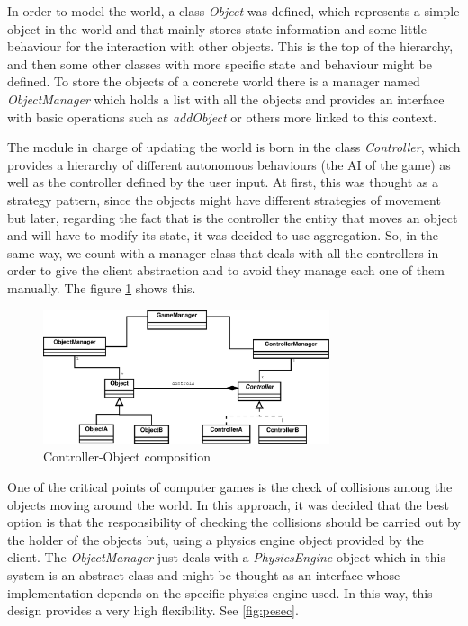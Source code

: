 \documentclass[]{article}
\begin{document}
In order to model the world, a class \emph{Object} was defined, which represents a simple object in the world and that mainly stores state information and some little behaviour for the interaction
with other objects. This is the top of the hierarchy, and then some other classes with more specific state and behaviour might be defined. To store the objects of a concrete world there is a manager
named \emph{ObjectManager} which holds a list with all the objects and provides an interface with basic operations such as \emph{addObject} or others more linked to this context.

The module in charge of updating the world is born in the class \emph{Controller}, which provides a hierarchy of different autonomous behaviours (the AI of the game) as well as the controller defined
by the user input. At first, this was thought as a strategy pattern, since the objects might have different strategies of movement but later, regarding the fact that is the controller the entity
that moves an object and will have to modify its state, it was decided to use aggregation. So, in the same way, we count with a manager class that deals with all the controllers in order to give 
the client abstraction and to avoid they manage each one of them manually. The figure \ref{fig:object-controller} shows this.

\begin{figure}[h]
\begin{center}
\includegraphics[width=0.75\textwidth]{images/object-controller.eps}
\caption{Controller-Object composition}
\label{fig:object-controller}
\end{center}
\end{figure}

One of the critical points of computer games is the check of collisions among the objects moving around the world. In this approach, it was decided that the best option is that the responsibility
of checking the collisions should be carried out by the holder of the objects but, using a physics engine object provided by the client. The \emph{ObjectManager} just deals with a \emph{PhysicsEngine}
object which in this system is an abstract class and might be thought as an interface whose implementation depends on the specific physics engine used. In this way, this design provides a very high
flexibility. See \ref{fig:pesec}.
\end{document}
